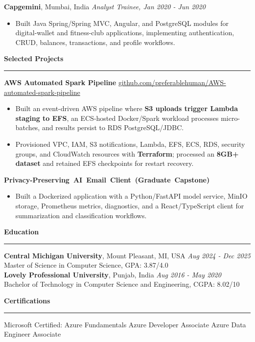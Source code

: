 \documentclass[11pt,letterpaper]{article}
\newcommand{\ressection}[1]{\Needspace{6\baselineskip}\vspace{8pt}\par\textbf{#1}\par\vspace{2pt}\hrule\vspace{5pt}}
\begin{document}
\textbf{Capgemini}, Mumbai, India \hfill \textit{Analyst Trainee, Jan 2020 - Jun 2020}
\begin{itemize}
  \item Built Java Spring/Spring MVC, Angular, and PostgreSQL modules for digital-wallet and fitness-club applications, implementing authentication, CRUD, balances, transactions, and profile workflows.
\end{itemize}

\ressection{Selected Projects}
\textbf{AWS Automated Spark Pipeline} \hfill \href{https://github.com/preferablehuman/AWS-automated-spark-pipeline}{github.com/preferablehuman/AWS-automated-spark-pipeline}
\begin{itemize}
  \item Built an event-driven AWS pipeline where \textbf{S3 uploads trigger Lambda staging to EFS}, an ECS-hosted Docker/Spark workload processes micro-batches, and results persist to RDS PostgreSQL/JDBC.
  \item Provisioned VPC, IAM, S3 notifications, Lambda, EFS, ECS, RDS, security groups, and CloudWatch resources with \textbf{Terraform}; processed an \textbf{8GB+ dataset} and retained EFS checkpoints for restart recovery.
\end{itemize}
\vskip 6pt
\hbox{\textbf{Privacy-Preserving AI Email Client (Graduate Capstone)}}
\begin{itemize}
  \item Built a Dockerized application with a Python/FastAPI model service, MinIO storage, Prometheus metrics, diagnostics, and a React/TypeScript client for summarization and classification workflows.
\end{itemize}

\ressection{Education}
\textbf{Central Michigan University}, Mount Pleasant, MI, USA \hfill \textit{Aug 2024 - Dec 2025}\\
Master of Science in Computer Science, GPA: 3.87/4.0\\[2pt]
\textbf{Lovely Professional University}, Punjab, India \hfill \textit{Aug 2016 - May 2020}\\
Bachelor of Technology in Computer Science and Engineering, CGPA: 8.02/10

\ressection{Certifications}
Microsoft Certified: Azure Fundamentals \textbar{} Azure Developer Associate \textbar{} Azure Data Engineer Associate
\end{document}
